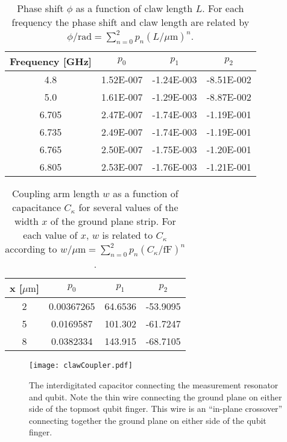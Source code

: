 \begin{table} \begin{center} \begin{tabular}{  c  c  c  c  }
\hline \hline
Frequency [GHz]	&	\quad	$p_0$	&	\quad $p_1$	&	\quad	$p_2$ \\
\hline
4.8 & 1.52E-007 & -1.24E-003 & -8.51E-002 \\
5.0 & 1.61E-007 & -1.29E-003 & -8.87E-002 \\
6.705 & 2.47E-007 & -1.74E-003 & -1.19E-001 \\
6.735 & 2.49E-007 & -1.74E-003 & -1.19E-001 \\
6.765 & 2.50E-007 & -1.75E-003 & -1.20E-001 \\
6.805 & 2.53E-007 & -1.76E-003 & -1.21E-001 \\
\hline \hline
\end{tabular}
\end{center}
\caption{Phase shift $\phi$ as a function of claw length $L$. For each frequency the phase shift and claw length are related by $\phi / \text{rad} = \sum_{n=0}^2 p_n (L/\mu\text{m})^n$.}
\label{Table:LToPhi}
\end{table}

\begin{table} \begin{center} \begin{tabular}{  c  c  c  c  }
\hline \hline
x [$\mu\text{m}$]	&	\quad	$p_0$	&	\quad $p_1$	&	\quad	$p_2$ \\
\hline
2 & 0.00367265 & 64.6536 & -53.9095 \\
5 & 0.0169587 & 101.302 & -61.7247 \\
8 & 0.0382334 & 143.915 & -68.7105 \\
\hline \hline
\end{tabular}
\end{center}
\caption{Coupling arm length $w$ as a function of capacitance $C_{\kappa}$ for several values of the width $x$ of the ground plane strip. For each value of $x$, $w$ is related to $C_{\kappa}$ according to $w/\mu\text{m} = \sum_{n=0}^2 p_n (C_{\kappa}/\text{fF})^n$.}
\label{Table:couplerArm}
\end{table}

\begin{figure}
\begin{centering}
\texttt{[image: clawCoupler.pdf]}
\par\end{centering}
\caption{The interdigitated capacitor connecting the measurement resonator and qubit. Note the thin wire connecting the ground plane on either side of the topmost qubit finger. This wire is an ``in-plane crossover'' connecting together the ground plane on either side of the qubit finger.}
\label{Fig:clawCoupler}
\end{figure}

